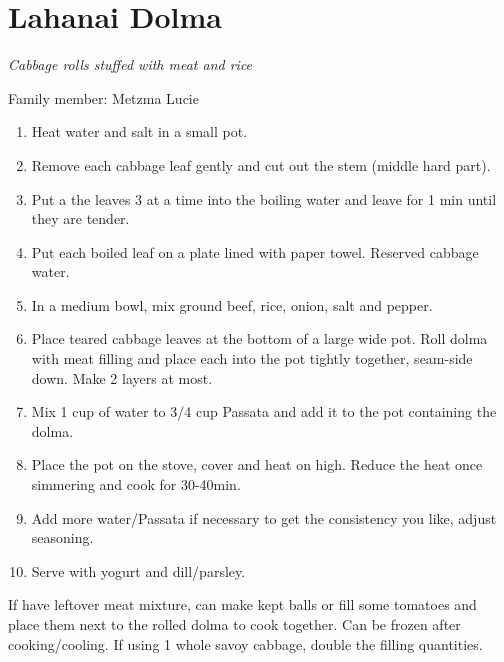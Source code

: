 \chapter{Lahanai Dolma}
\label{ch:lahanai_dolma}



\textit{Cabbage rolls stuffed with meat and rice}

Family member: Metzma Lucie

\begin{enumerate}
    \item Heat water and salt in a small pot.
    \item Remove each cabbage leaf gently and cut out the stem (middle hard part).
    \item Put a the leaves 3 at a time into the boiling water and leave for 1 min until they are tender.
    \item Put each boiled leaf on a plate lined with paper towel. Reserved cabbage water.
    \item In a medium bowl, mix ground beef, rice, onion, salt and pepper.
    \item Place teared cabbage leaves at the bottom of a large wide pot. Roll dolma with meat filling and place each into the pot tightly together, seam-side down. Make 2 layers at most.
    \item Mix 1 cup of water to 3/4 cup Passata and add it to the pot containing the dolma.
    \item Place the pot on the stove, cover and heat on high. Reduce the heat once simmering and cook for 30-40min.
    \item Add more water/Passata if necessary to get the consistency you like, adjust seasoning.
    \item Serve with yogurt and dill/parsley.
\end{enumerate}

If have leftover meat mixture, can make kept balls or fill some tomatoes and place them next to the rolled dolma to cook together.
Can be frozen after cooking/cooling.
If using 1 whole savoy cabbage, double the filling quantities.
